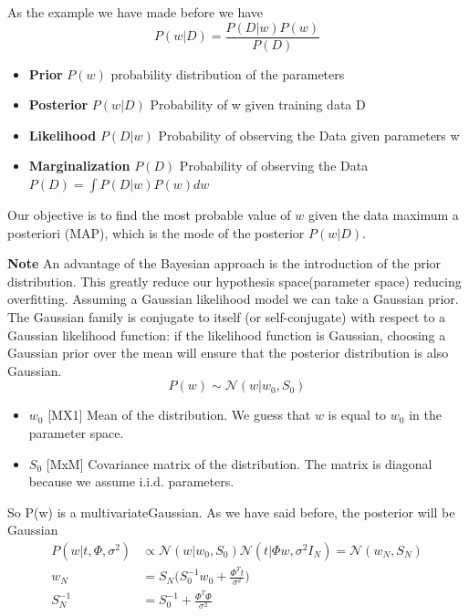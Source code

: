 \documentclass[main.tex]{subfiles}
\begin{document}
As the example we have made before we have
\begin{equation*}
    P(w|D) = \frac{P(D|w)P(w)}{P(D)}
\end{equation*}
\begin{itemize}
    \item \textbf{Prior} $P(w)$ probability distribution of the parameters
    \item \textbf{Posterior} $P(w|D)$ Probability of w given training data D
    \item \textbf{Likelihood} $P(D|w)$ Probability of observing the Data given parameters w
    \item \textbf{Marginalization} $P(D)$ Probability of observing the Data $P(D)=\int P(D|w)P(w)dw$
\end{itemize}
Our objective is to find the most probable value of $w$ given the data maximum a
posteriori (MAP), which is the mode of the posterior $P(w|D)$.

\textbf{Note} An advantage of the Bayesian approach is the introduction of the prior distribution. This greatly reduce our hypothesis space(parameter space) reducing overfitting.
Assuming a Gaussian likelihood model we can take a Gaussian prior.
The Gaussian family is conjugate to itself (or self-conjugate) with respect to a Gaussian likelihood function: if the likelihood function is Gaussian, choosing a Gaussian prior over the mean will ensure that the posterior distribution is also Gaussian.
\begin{equation}
    P(w) \sim \mathcal{N} (w|w_0, S_0)
\end{equation}
\begin{itemize}
    \item $w_0$ [MX1] Mean of the distribution. We guess that $w$ is equal to $w_0$ in the parameter space.
    \item $S_0$ [MxM] Covariance matrix of the distribution. The matrix is diagonal because we assume i.i.d. parameters.
\end{itemize}
So P(w) is a multivariate\footnotemark Gaussian.
As we have said before, the posterior will be Gaussian
\begin{align*}
    P(w|t, \Phi, \sigma^2) &\propto \mathcal{N} (w|w_0, S_0) \mathcal{N} (t|\Phi w, \sigma^2I_N) = \mathcal{N} (w_N,S_N)\\
    w_N &= S_N \bigg( S_0^{-1}w_0 + \frac{\Phi^T t}{\sigma^2} \bigg) \\
    S_N^{-1} &= S_0^{-1} + \frac{\Phi^T \Phi}{\sigma^2}
\end{align*}
\end{document}
